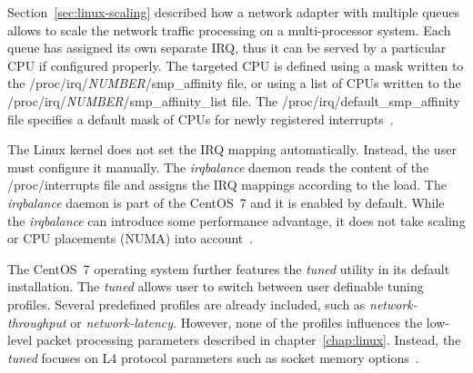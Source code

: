 Section~\ref{sec:linux-scaling} described how a network adapter with multiple queues
allows to scale the network traffic processing on a multi-processor system.
Each queue has assigned its own separate IRQ, thus it can be served by a particular CPU if configured properly.
The targeted CPU is defined using a mask written to the /proc/irq/{\it{NUMBER}}/smp\_affinity file,
or using a list of CPUs written to the /proc/irq/{\it{NUMBER}}/smp\_affinity\_list file.
The /proc/irq/default\_smp\_affinity file specifies a
default mask of CPUs for newly registered interrupts~\cite{kernel-doc-irq-affinity}.

The Linux kernel does not set the IRQ mapping automatically.
Instead, the user must configure it manually.
The {\it{irqbalance}} daemon reads the content of the /proc/interrupts file
and assigns the IRQ mappings according to the load.
The {\it{irqbalance}} daemon is part of the CentOS~7 and it is enabled by default.
While the {\it{irqbalance}} can introduce some performance advantage,
it does not take scaling or CPU placements (NUMA) into account~\cite{irqbalance-source}.

The CentOS~7 operating system further features the {\it{tuned}} utility in its default installation.
The {\it{tuned}} allows user to switch between user definable tuning profiles.
Several predefined profiles are already included, such as {\it{network-throughput}} or {\it{network-latency}}.
However, none of the profiles influences the low-level packet processing parameters described in chapter~\ref{chap:linux}.
Instead, the {\it{tuned}} focuses on L4 protocol parameters such as socket memory options~\cite{tuned}.
